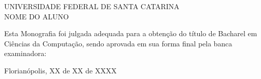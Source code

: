 
%
% 
%
\begin{folhadeaprovacao}


\begin{center}


            {UNIVERSIDADE FEDERAL DE SANTA CATARINA} \\
           

    \vspace{1.5cm}
                                    {NOME DO ALUNO}\\
    \bfseries{}
\end{center}

Esta Monografia foi julgada adequada para a obten\c{c}\~{a}o do título  de Bacharel em Ciências da Computação, sendo aprovada em sua forma final  pela banca examinadora:

    \vspace{2.5cm}
    \vspace{3 cm}%

    \begin{center}
        Florianópolis, XX de XX de XXXX
    \end{center}
  
\end{folhadeaprovacao}